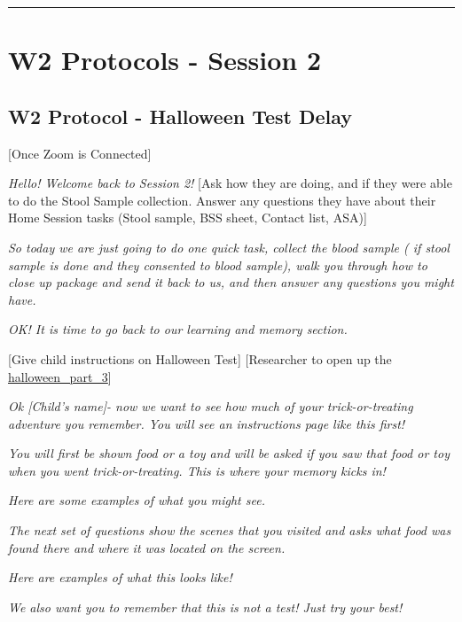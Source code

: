 \documentclass[]{book}
\begin{document}
\begin{center}\rule{0.5\linewidth}{0.5pt}\end{center}

\hypertarget{w2-protocols---session-2}{%
\section{W2 Protocols - Session 2}\label{w2-protocols---session-2}}

\hypertarget{w2-protocol---halloween-test-delay}{%
\subsection{W2 Protocol - Halloween Test Delay}\label{w2-protocol---halloween-test-delay}}

{[}Once Zoom is Connected{]}

\emph{Hello! Welcome back to Session 2!} {[}Ask how they are doing, and if they were able to do the Stool Sample collection. Answer any questions they have about their Home Session tasks (Stool sample, BSS sheet, Contact list, ASA){]}

\emph{So today we are just going to do one quick task, collect the blood sample ( if stool sample is done and they consented to blood sample), walk you through how to close up package and send it back to us, and then answer any questions you might have.}

\emph{OK! It is time to go back to our learning and memory section.}

{[}Give child instructions on Halloween Test{]} {[}Researcher to open up the \href{https://app.box.com/file/784713950398}{halloween\_part\_3}{]}

\emph{Ok {[}Child's name{]}- now we want to see how much of your trick-or-treating adventure you remember. You will see an instructions page like this first!}

\emph{You will first be shown food or a toy and will be asked if you saw that food or toy when you went trick-or-treating. This is where your memory kicks in!}

\emph{Here are some examples of what you might see.}

\emph{The next set of questions show the scenes that you visited and asks what food was found there and where it was located on the screen.}

\emph{Here are examples of what this looks like!}

\emph{We also want you to remember that this is not a test! Just try your best!}
\end{document}
